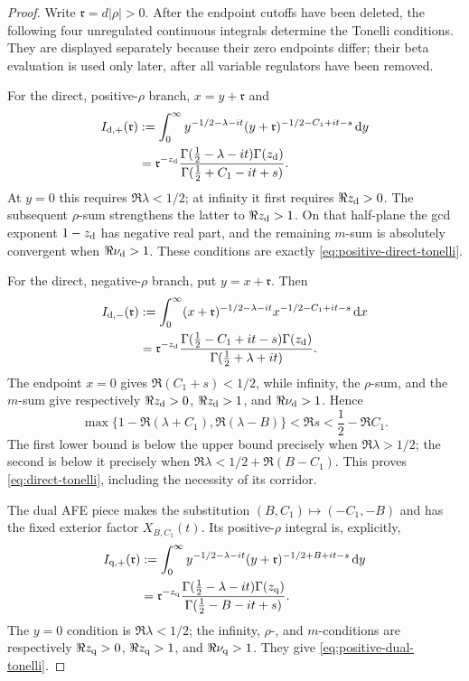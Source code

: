 \begin{proof}
Write $\mathfrak r=d|\rho|>0$.  After the endpoint cutoffs have been deleted,
the following four unregulated continuous integrals determine the Tonelli
conditions.  They are displayed separately because their zero endpoints
differ; their beta evaluation is used only later, after all variable
regulators have been removed.

For the direct, positive-$\rho$ branch, $x=y+\mathfrak r$ and
\begin{align}
 I_{{\rm d},+}(\mathfrak r)
 &:=\int_0^\infty y^{-1/2-\lambda-it}
       (y+\mathfrak r)^{-1/2-C_1+it-s}\,\mathrm d y\notag\\
 &=\mathfrak r^{-z_{\rm d}}
   \frac{\Gamma(\frac12-\lambda-it)\Gamma(z_{\rm d})}
        {\Gamma(\frac12+C_1-it+s)}.
 \label{eq:four-beta-dp}
\end{align}
At $y=0$ this requires $\Re\lambda<1/2$; at infinity it first requires
$\Re z_{\rm d}>0$.  The subsequent $\rho$-sum strengthens the latter to
$\Re z_{\rm d}>1$.  On that half-plane the gcd exponent
$1-z_{\rm d}$ has negative real part, and the remaining $m$-sum is
absolutely convergent when $\Re\nu_{\rm d}>1$.  These conditions are
exactly \eqref{eq:positive-direct-tonelli}.

For the direct, negative-$\rho$ branch, put $y=x+\mathfrak r$.  Then
\begin{align}
 I_{{\rm d},-}(\mathfrak r)
 &:=\int_0^\infty(x+\mathfrak r)^{-1/2-\lambda-it}
       x^{-1/2-C_1+it-s}\,\mathrm d x\notag\\
 &=\mathfrak r^{-z_{\rm d}}
   \frac{\Gamma(\frac12-C_1+it-s)\Gamma(z_{\rm d})}
        {\Gamma(\frac12+\lambda+it)}.
 \label{eq:four-beta-dm}
\end{align}
The endpoint $x=0$ gives $\Re(C_1+s)<1/2$, while infinity, the
$\rho$-sum, and the $m$-sum give respectively
$\Re z_{\rm d}>0$, $\Re z_{\rm d}>1$, and
$\Re\nu_{\rm d}>1$.  Hence
\[
 \max\{1-\Re(\lambda+C_1),\Re(\lambda-B)\}
 <\Re s<\frac12-\Re C_1.
\]
The first lower bound is below the upper bound precisely when
$\Re\lambda>1/2$; the second is below it precisely when
$\Re\lambda<1/2+\Re(B-C_1)$.  This proves
\eqref{eq:direct-tonelli}, including the necessity of its corridor.

The dual AFE piece makes the substitution
$(B,C_1)\mapsto(-C_1,-B)$ and has the fixed exterior factor
$X_{B,C_1}(t)$.  Its positive-$\rho$ integral is, explicitly,
\begin{align}
 I_{{\rm q},+}(\mathfrak r)
 &:=\int_0^\infty y^{-1/2-\lambda-it}
       (y+\mathfrak r)^{-1/2+B+it-s}\,\mathrm d y\notag\\
 &=\mathfrak r^{-z_{\rm q}}
   \frac{\Gamma(\frac12-\lambda-it)\Gamma(z_{\rm q})}
        {\Gamma(\frac12-B-it+s)}.
 \label{eq:four-beta-qp}
\end{align}
The $y=0$ condition is $\Re\lambda<1/2$; the infinity, $\rho$-, and
$m$-conditions are respectively
$\Re z_{\rm q}>0$, $\Re z_{\rm q}>1$, and
$\Re\nu_{\rm q}>1$.  They give
\eqref{eq:positive-dual-tonelli}.


\end{proof}
